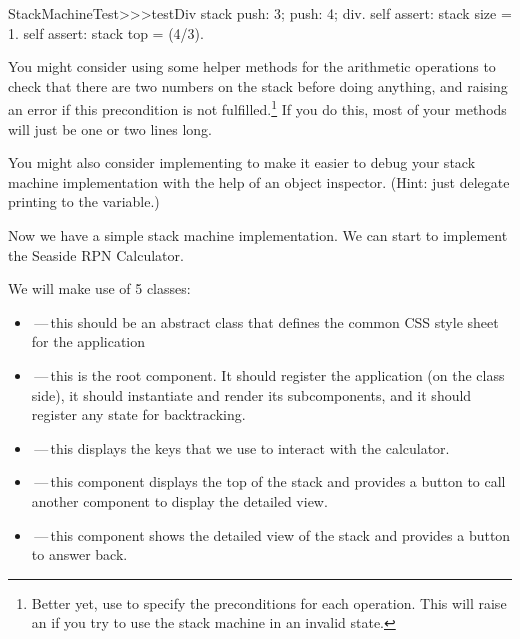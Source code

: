 \documentclass[a4paper,10pt,twoside]{book}
\begin{document}
\begin{code}{}
StackMachineTest>>>testDiv
	stack
		push: 3;
		push: 4;
		div.
	self assert: stack size = 1.
	self assert: stack top = (4/3).
\end{code}

You might consider using some helper methods for the arithmetic operations to check that there are two numbers on the stack before doing anything, and raising an error if this precondition is not fulfilled.\footnote{Better yet, use  to specify the preconditions for each operation.
This will raise an  if you try to use the stack machine in an invalid state.}
If you do this, most  of your methods will just be one or two lines long.

You might also consider implementing  to make it easier to debug your stack machine implementation with the help of an object inspector.
(Hint: just delegate printing to the  variable.)


Now we have a simple stack machine implementation.
We can start to implement the Seaside RPN Calculator.

We will make use of 5 classes:
\begin{itemize}
  \item {}\,---\,this should be an abstract class that defines the common CSS style sheet for the application
  \item {}\,---\,this is the root component.
  It should register the application (on the class side), it should instantiate and render its subcomponents, and it should register any state for backtracking.
  \item {}\,---\,this displays the keys that we use to interact with the calculator.
  \item {}\,---\,this component displays the top of the stack and provides a button to call another component to display the detailed view.
  \item {}\,---\,this component shows the detailed view of the stack and provides a button to answer back.
\end{itemize}
\end{document}
